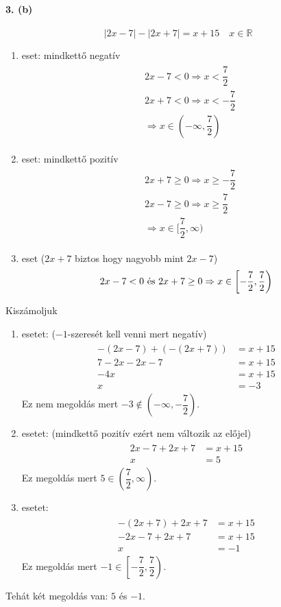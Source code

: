 \documentclass[12pt,a4paper,fleqn]{article}
\newcommand{\myparagraph}[1]{\paragraph{#1}\mbox{}}
\begin{document}
\myparagraph{3. (b)}
\[ |2x-7|-|2x+7|=x+15 \quad x \in \mathbb{R} \]
\begin{enumerate}
  \item eset: mindkettő negatív
  \begin{align*}
    \begin{split}
      &2x - 7 < 0 \Rightarrow x < \dfrac{7}{2} \\
      &2x + 7 < 0 \Rightarrow x < -\dfrac{7}{2} \\
      &\Longrightarrow x \in (-\infty, \dfrac{7}{2})
    \end{split}
  \end{align*}
  \item eset: mindkettő pozitív
  \begin{align*}
    \begin{split}
      &2x + 7 \geq 0 \Rightarrow x \geq -\dfrac{7}{2} \\
      &2x - 7 \geq 0 \Rightarrow x \geq \dfrac{7}{2} \\
      &\Longrightarrow x \in [\dfrac{7}{2}, \infty)
    \end{split}
  \end{align*}
  \item eset ($2x+7$ biztos hogy nagyobb mint $2x-7$)
  \[ 2x-7<0$ és $2x+7 \geq 0 \Rightarrow x \in \left[ -\dfrac{7}{2},
    \dfrac{7}{2} \right) \]
\end{enumerate}
Kiszámoljuk
\begin{enumerate}
  \item esetet: ($-1$-szeresét kell venni mert negatív)
  \begin{align*}
    \begin{split}
      -(2x-7)+(-(2x+7)) &= x + 15 \\
      7-2x-2x-7&=x+15 \\
      -4x&=x+15 \\
      x &=-3
    \end{split}
  \end{align*}
  Ez nem megoldás mert $-3 \notin (-\infty, -\dfrac{7}{2})$.
  \item esetet: (mindkettő pozitív ezért nem változik az előjel)
  \begin{align*}
    \begin{split}
      2x-7+2x+7 &= x + 15 \\
      x &= 5
    \end{split}
  \end{align*}
  Ez megoldás mert $5 \in (\dfrac{7}{2}, \infty)$.
  \item esetet:
  \begin{align*}
    \begin{split}
      -(2x+7)+2x+7 &= x + 15 \\
      -2x-7+2x+7 &= x + 15 \\
      x &= -1
    \end{split}
  \end{align*}
  Ez megoldás mert $-1 \in \left[ -\dfrac{7}{2}, \dfrac{7}{2} \right)$.
\end{enumerate}
Tehát két megoldás van: $5$ és $-1$.
\end{document}
